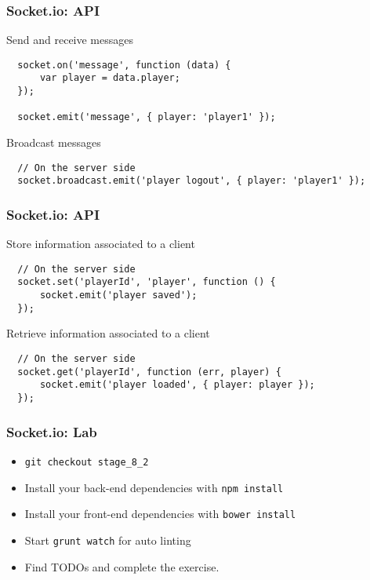 \begin{frame}[fragile]
  \frametitle{Socket.io: API}

  \begin{block}{Send and receive messages}
  {\tiny
  \begin{verbatim}
  socket.on('message', function (data) {
      var player = data.player;
  });

  socket.emit('message', { player: 'player1' });
  \end{verbatim}
  }
  \end{block}

  \pause

  \begin{block}{Broadcast messages}
  {\tiny
  \begin{verbatim}
  // On the server side
  socket.broadcast.emit('player logout', { player: 'player1' });
  \end{verbatim}
  }
  \end{block}
\end{frame}

\begin{frame}[fragile]
  \frametitle{Socket.io: API}

  \begin{block}{Store information associated to a client}
  {\tiny
  \begin{verbatim}
  // On the server side
  socket.set('playerId', 'player', function () {
      socket.emit('player saved');
  });
  \end{verbatim}
  }
  \end{block}

  \pause

  \begin{block}{Retrieve information associated to a client}
  {\tiny
  \begin{verbatim}
  // On the server side
  socket.get('playerId', function (err, player) {
      socket.emit('player loaded', { player: player });
  });
  \end{verbatim}
  }
  \end{block}
\end{frame}

\begin{frame}[fragile]
  \frametitle{Socket.io: Lab}

  \begin{itemize}
    \item \texttt{git checkout stage\_8\_2}
    \item Install your back-end dependencies with \texttt{npm install}
    \item Install your front-end dependencies with \texttt{bower install}
    \item Start \texttt{grunt watch} for auto linting
    \item Find TODOs and complete the exercise.
  \end{itemize}
\end{frame}

